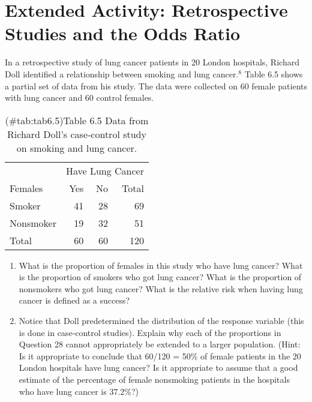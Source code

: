 \documentclass[
]{report}
\providecommand{\tightlist}{%
  \setlength{\itemsep}{0pt}\setlength{\parskip}{0pt}}
\begin{document}
\section*{Extended Activity: Retrospective Studies and the Odds Ratio}\label{extended-activity-retrospective-studies-and-the-odds-ratio}

In a retrospective study of lung cancer patients in 20 London hospitals, Richard Doll identified a relationship between smoking and lung cancer.\(^8\) Table 6.5 shows a partial set of data from his study. The data were collected on 60 female patients with lung cancer and 60 control females.

\begin{table}[!h]
\centering
\caption{(\#tab:tab6.5)Table 6.5 Data from Richard Doll’s case‐control study on smoking and lung cancer.}
\centering
\begin{tabular}[t]{lrrr}
\toprule
\multicolumn{1}{c}{ } & \multicolumn{3}{c}{Have Lung Cancer} \\
\cmidrule(l{3pt}r{3pt}){2-4}
Females & Yes & No & Total\\
\midrule
Smoker & 41 & 28 & 69\\
Nonsmoker & 19 & 32 & 51\\
Total & 60 & 60 & 120\\
\bottomrule
\end{tabular}
\end{table}

\begin{enumerate}
\def\labelenumi{\arabic{enumi}.}
\setcounter{enumi}{27}
\tightlist
\item
  What is the proportion of females in this study who have lung cancer? What is the proportion of smokers who got lung cancer? What is the proportion of nonsmokers who got lung cancer? What is the relative risk when having lung cancer is defined as a success?\\
\item
  Notice that Doll predetermined the distribution of the response variable (this is done in case‑control studies). Explain why each of the proportions in Question 28 cannot appropriately be extended to a larger population. (Hint: Is it appropriate to conclude that 60/120 = 50\% of female patients in the 20 London hospitals have lung cancer? Is it appropriate to assume that a good estimate of the percentage of female nonsmoking patients in the hospitals who have lung cancer is 37.2\%?)
\end{enumerate}
\end{document}
